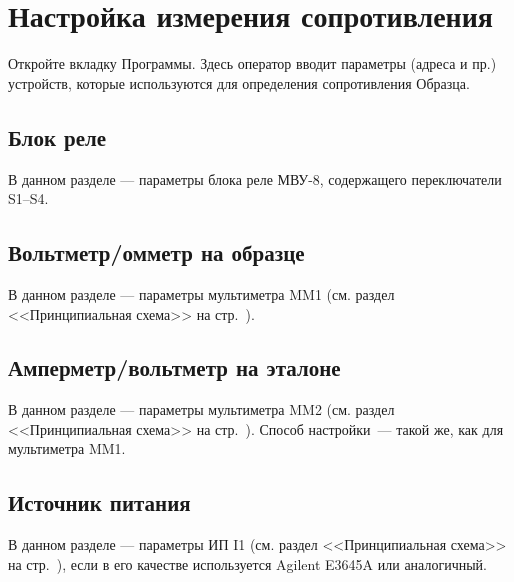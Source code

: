 \documentclass[12pt, a4paper, twocolumn]{report}
\begin{document}


\section{Настройка измерения сопротивления}

Откройте вкладку  Программы. Здесь оператор вводит параметры (адреса и пр.) устройств, которые используются для определения сопротивления Образца.

\subsection{Блок реле}

В данном разделе --- параметры блока реле МВУ-8, содержащего переключатели S1--S4.



\subsection{Вольтметр/омметр на образце}
\label{sec_mm1_config}

В данном разделе --- параметры мультиметра MM1 (см. раздел <<Принципиальная схема>> на стр.~\pageref{sec_schematic_diagram}).



\subsection{Амперметр/вольтметр на эталоне}

В данном разделе --- параметры мультиметра MM2 (см. раздел <<Принципиальная схема>> на стр.~\pageref{sec_schematic_diagram}). Способ настройки~--- такой же, как для мультиметра MM1.


\subsection{Источник питания}

В данном разделе --- параметры ИП I1 (см. раздел <<Принципиальная схема>> на стр.~\pageref{sec_schematic_diagram}), если в его качестве используется Agilent E3645A или аналогичный.
\end{document}

